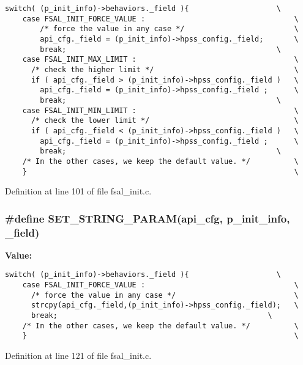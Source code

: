 \footnotesize\begin{verbatim}switch( (p_init_info)->behaviors._field ){                    \
    case FSAL_INIT_FORCE_VALUE :                                  \
        /* force the value in any case */                         \
        api_cfg._field = (p_init_info)->hpss_config._field;       \
        break;                                                \
    case FSAL_INIT_MAX_LIMIT :                                    \
      /* check the higher limit */                                \
      if ( api_cfg._field > (p_init_info)->hpss_config._field )   \
        api_cfg._field = (p_init_info)->hpss_config._field ;      \
        break;                                                \
    case FSAL_INIT_MIN_LIMIT :                                    \
      /* check the lower limit */                                 \
      if ( api_cfg._field < (p_init_info)->hpss_config._field )   \
        api_cfg._field = (p_init_info)->hpss_config._field ;      \
        break;                                                \
    /* In the other cases, we keep the default value. */          \
    }                                                             \
\end{verbatim}\normalsize 


Definition at line 101 of file fsal\_\-init.c.
\subsubsection{\setlength{\rightskip}{0pt plus 5cm}\#define SET\_\-STRING\_\-PARAM(api\_\-cfg, p\_\-init\_\-info, \_\-field)}\label{fsal__init_8c_a2}


{\bf Value:}

\footnotesize\begin{verbatim}switch( (p_init_info)->behaviors._field ){                    \
    case FSAL_INIT_FORCE_VALUE :                                  \
      /* force the value in any case */                           \
      strcpy(api_cfg._field,(p_init_info)->hpss_config._field);   \
      break;                                                \
    /* In the other cases, we keep the default value. */          \
    }                                                             \
\end{verbatim}\normalsize 


Definition at line 121 of file fsal\_\-init.c.

